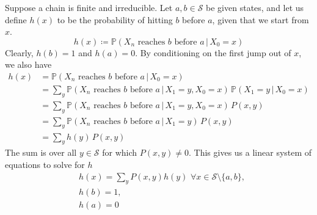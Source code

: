 	\begin{definition}
	  
	\end{definition}

	\begin{example}
		Suppose a chain is finite and irreducible. Let $a, b \in \mathcal{S}$ be given states, and let us define $h(x)$ to be the probability of hitting $b$ before $a$, given that we start from $x$. 
		\begin{equation}
			h(x) \coloneqq \mathbb{P} (X_n \text{ reaches } b \text{ before } a \, | \, X_0 = x)
		\end{equation}
		Clearly, $h(b) = 1$ and $h(a) = 0$. By conditioning on the first jump out of $x$, we also have 
		\begin{align*}
			h(x) & = \mathbb{P}(X_n \text{ reaches } b \text{ before } a \, | \, X_0 = x) \\
			& = \sum_{y} \mathbb{P}(X_n \text{ reaches } b \text{ before } a \, | \, X_1 = y, X_0 = x) \, \mathbb{P}(X_1 = y \,|\,X_0 = x) \\
			& = \sum_y \mathbb{P}(X_n \text{ reaches } b \text{ before } a \, | \,X_1 = y, X_0 = x) \, P(x, y) \\
			& = \sum_y \mathbb{P}(X_n \text{ reaches } b \text{ before } a \, | \,X_1 = y) \, P(x, y) \\
			& = \sum_y h(y) \, P(x, y) 
		\end{align*}
		The sum is over all $y \in \mathcal{S}$ for which $P(x, y) \neq 0$. This gives us a linear system of equations to solve for $h$
		\begin{align*}
			& h(x) = \sum_y P(x, y) h(y) \,\, \forall x \in \mathcal{S} \setminus \{a, b\}, \\
			& h(b) = 1, \\
			& h(a) = 0
		\end{align*}
	\end{example}

